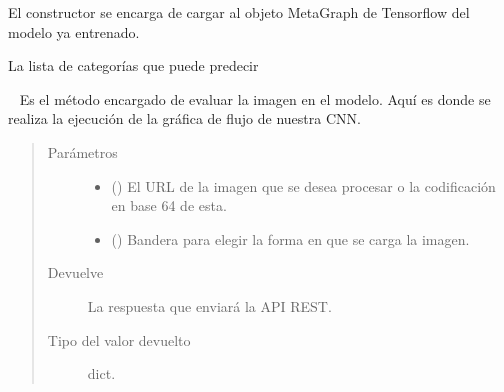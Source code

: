 \begin{fulllineitems}
El constructor se encarga de cargar al objeto MetaGraph de Tensorflow
del modelo ya entrenado.

\begin{fulllineitems}
\label{\detokenize{chapter_two/desc_cloudnao:app.tf_models.indoor_scenes_classifier.ImageClassifier.categories}}
La lista de categorías que puede predecir

\end{fulllineitems}


\begin{fulllineitems}
\label{\detokenize{chapter_two/desc_cloudnao:app.tf_models.indoor_scenes_classifier.ImageClassifier.classify_image}}~
Es el método encargado de evaluar la imagen en el modelo. Aquí es donde
se realiza la ejecución de la gráfica de flujo de nuestra CNN.
\begin{quote}\begin{description}
\item[{Parámetros}] \leavevmode\begin{itemize}
\item {} 
 () \textendash{} El URL de la imagen que se desea procesar o la codificación en base 64 de esta.

\item {} 
 () \textendash{} Bandera para elegir la forma en que se carga la imagen.

\end{itemize}

\item[{Devuelve}] \leavevmode
La respuesta que enviará la API REST.

\item[{Tipo del valor devuelto}] \leavevmode
dict.

\end{description}\end{quote}

\end{fulllineitems}


\end{fulllineitems}



